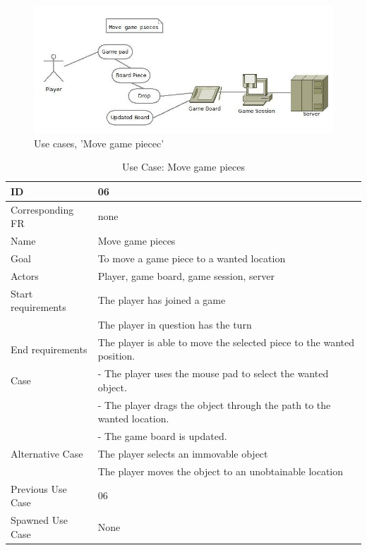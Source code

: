\begin{figure}[H]
  \centering
    \includegraphics[width=1.0\textwidth]{img/movegamepieces.jpg}
  \caption{Use cases, 'Move game piecec'} 
  \label{fig:movepiece}
\end{figure}


\begin{table}[H]
\begin{tabular}{|l|p{14cm}|}
\hline
	\textbf{ID} & \textbf{06}\\ \hline
	Corresponding FR & none\\ \hline
	Name & Move game pieces \\ \hline
	Goal & To move a game piece to a wanted location \\ \hline
	Actors & Player, game board, game session, server \\ \hline
	Start requirements & The player has joined a game \\
				& The player in question has the turn \\ \hline
	End requirements & The player is able to move the selected piece to the wanted position. \\ \hline
	Case & - The player uses the mouse pad to select the wanted object. \\
		& - The player drags the object through the path to the wanted location. \\
		& - The game board is updated. \\ \hline
	Alternative Case & The player selects an immovable object \\
				& The player moves the object to an unobtainable location\\ \hline
	Previous Use Case & 06 \\ \hline
	Spawned Use Case & None\\ \hline
\end{tabular}
\caption{Use Case: Move game pieces}
\label{fig:usecase06table}
\end{table}


